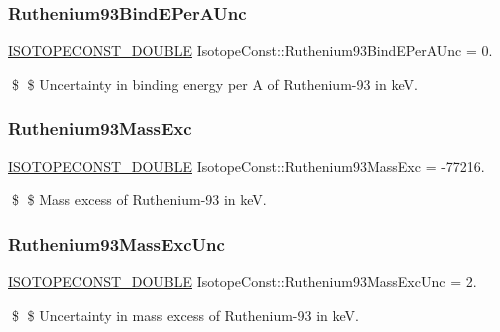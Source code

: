 \subsubsection{\texorpdfstring{Ruthenium93\+Bind\+E\+Per\+A\+Unc}{Ruthenium93BindEPerAUnc}}
{\footnotesize\ttfamily \mbox{\hyperlink{group___isotope_const-_macros_ga8f45a7272ce02c0b4c65c44636ed719a}{I\+S\+O\+T\+O\+P\+E\+C\+O\+N\+S\+T\+\_\+\+D\+O\+U\+B\+LE}} Isotope\+Const\+::\+Ruthenium93\+Bind\+E\+Per\+A\+Unc = 0.}

\$ \$ Uncertainty in binding energy per A of Ruthenium-\/93 in keV. \mbox{\label{group___isotope_const-_ruthenium-_ru93_gadfcc3964d1ea5b6f120dc7391c52e759}} 
\subsubsection{\texorpdfstring{Ruthenium93\+Mass\+Exc}{Ruthenium93MassExc}}
{\footnotesize\ttfamily \mbox{\hyperlink{group___isotope_const-_macros_ga8f45a7272ce02c0b4c65c44636ed719a}{I\+S\+O\+T\+O\+P\+E\+C\+O\+N\+S\+T\+\_\+\+D\+O\+U\+B\+LE}} Isotope\+Const\+::\+Ruthenium93\+Mass\+Exc = -\/77216.}

\$ \$ Mass excess of Ruthenium-\/93 in keV. \mbox{\label{group___isotope_const-_ruthenium-_ru93_ga05cc4599c7114361efef74ca2da793ce}} 
\subsubsection{\texorpdfstring{Ruthenium93\+Mass\+Exc\+Unc}{Ruthenium93MassExcUnc}}
{\footnotesize\ttfamily \mbox{\hyperlink{group___isotope_const-_macros_ga8f45a7272ce02c0b4c65c44636ed719a}{I\+S\+O\+T\+O\+P\+E\+C\+O\+N\+S\+T\+\_\+\+D\+O\+U\+B\+LE}} Isotope\+Const\+::\+Ruthenium93\+Mass\+Exc\+Unc = 2.}

\$ \$ Uncertainty in mass excess of Ruthenium-\/93 in keV. \mbox{\label{group___isotope_const-_ruthenium-_ru93_ga0a6b84d8ef6f895abd943a5a1e7e6882}} 
